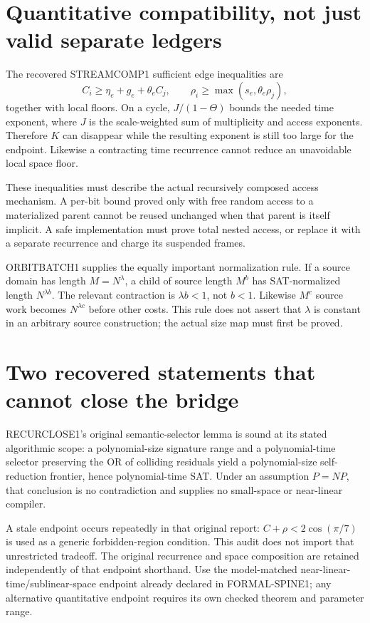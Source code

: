 \documentclass[11pt]{article}
\begin{document}
\section{Quantitative compatibility, not just valid separate ledgers}
The recovered STREAMCOMP1 sufficient edge inequalities are
\[
 C_i\ge \eta_e+g_e+\theta_e C_j,\qquad
 \rho_i\ge\max(s_e,\theta_e\rho_j),
\]
together with local floors. On a cycle, $J/(1-\Theta)$ bounds the needed
time exponent, where $J$ is the scale-weighted sum of multiplicity and access
exponents. Therefore $K$ can disappear while the resulting exponent is still
too large for the endpoint. Likewise a contracting time recurrence cannot
reduce an unavoidable local space floor.

These inequalities must describe the actual recursively composed access
mechanism. A per-bit bound proved only with free random access to a materialized
parent cannot be reused unchanged when that parent is itself implicit.
A safe implementation must prove total nested access, or replace it with a
separate recurrence and charge its suspended frames.

ORBITBATCH1 supplies the equally important normalization rule. If a source
domain has length $M=N^\lambda$, a child of source length $M^b$ has SAT-normalized
length $N^{\lambda b}$. The relevant contraction is $\lambda b<1$, not $b<1$.
Likewise $M^c$ source work becomes $N^{\lambda c}$ before other costs. This rule
does not assert that $\lambda$ is constant in an arbitrary source construction;
the actual size map must first be proved.

\section{Two recovered statements that cannot close the bridge}
RECURCLOSE1's original semantic-selector lemma is sound at its stated
algorithmic scope: a polynomial-size signature range and a polynomial-time
selector preserving the OR of colliding residuals yield a polynomial-size
self-reduction frontier, hence polynomial-time SAT. Under an assumption
$P=NP$, that conclusion is no contradiction and supplies no small-space or
near-linear compiler.

A stale endpoint occurs repeatedly in that original report:
$C+\rho<2\cos(\pi/7)$ is used as a generic forbidden-region condition. This
audit does not import that unrestricted tradeoff. The original recurrence and
space composition are retained independently of that endpoint shorthand.
Use the model-matched near-linear-time/sublinear-space endpoint already
declared in FORMAL-SPINE1; any alternative quantitative endpoint requires
its own checked theorem and parameter range.
\end{document}

